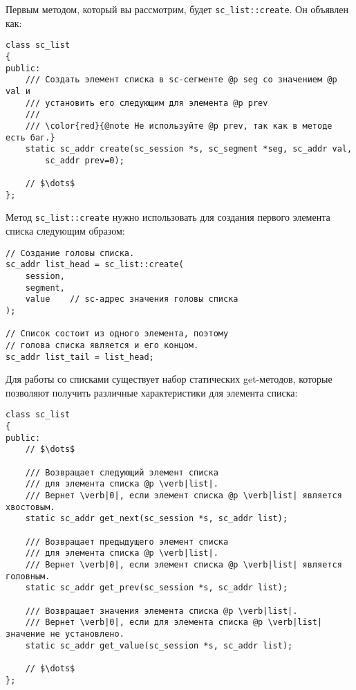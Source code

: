 Первым методом, который вы рассмотрим, будет
\lstinline|sc_list::create|. Он объявлен как:

\begin{lstlisting}[texcl]
class sc_list
{
public:
    /// Создать элемент списка в sc-сегменте @p seg со значением @p val и
    /// установить его следующим для элемента @p prev
    ///
    /// \color{red}{@note Не используйте @p prev, так как в методе есть баг.}
    static sc_addr create(sc_session *s, sc_segment *seg, sc_addr val,
        sc_addr prev=0);

    // $\dots$
};
\end{lstlisting}

Метод \lstinline|sc_list::create| нужно использовать для создания
первого элемента списка следующим образом:

\begin{lstlisting}[texcl]
// Создание головы списка.
sc_addr list_head = sc_list::create(
    session,
    segment,
    value    // sc-адрес значения головы списка
);

// Список состоит из одного элемента, поэтому
// голова списка является и его концом.
sc_addr list_tail = list_head;
\end{lstlisting}





Для работы со списками существует набор статических get-методов,
которые позволяют получить различные характеристики для элемента
списка:

\begin{lstlisting}[texcl]
class sc_list
{
public:
    // $\dots$

    /// Возвращает следующий элемент списка
    /// для элемента списка @p \verb|list|.
    /// Вернет \verb|0|, если элемент списка @p \verb|list| является хвостовым.
    static sc_addr get_next(sc_session *s, sc_addr list);

    /// Возвращает предыдущего элемент списка
    /// для элемента списка @p \verb|list|.
    /// Вернет \verb|0|, если элемент списка @p \verb|list| является головным.
    static sc_addr get_prev(sc_session *s, sc_addr list);

    /// Возвращает значения элемента списка @p \verb|list|.
    /// Вернет \verb|0|, если для элемента списка @p \verb|list| значение не установлено.
    static sc_addr get_value(sc_session *s, sc_addr list);

    // $\dots$
};
\end{lstlisting}

